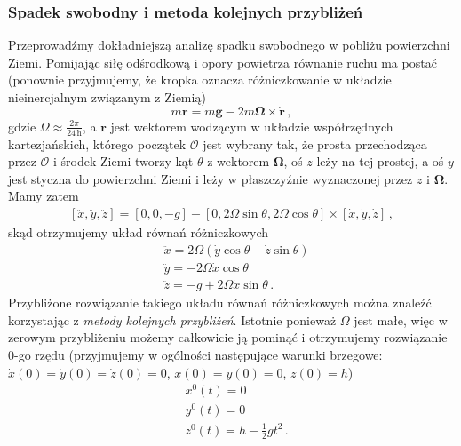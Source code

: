 \documentclass[../main.tex]{subfiles}
\begin{document}
\subsubsection*{Spadek swobodny i metoda kolejnych przybliżeń}
Przeprowadźmy dokładniejszą analizę spadku swobodnego w pobliżu powierzchni Ziemi. Pomijając siłę odśrodkową i opory powietrza równanie ruchu ma postać (ponownie przyjmujemy, że kropka oznacza różniczkowanie w układzie nieinercjalnym związanym z Ziemią)
\begin{equation*}
    m\ddot{\mathbf{r}}=m\mathbf{g}-2m\boldsymbol{\Omega}\times\dot{\mathbf{r}}\,,
\end{equation*}
gdzie \(\Omega\approx\frac{2\pi}{24\,\text{h}}\), a \(\mathbf{r}\) jest wektorem wodzącym w układzie współrzędnych kartezjańskich, którego początek \(\mathcal{O}\) jest wybrany tak, że prosta przechodząca przez \(\mathcal{O}\) i środek Ziemi tworzy kąt \(\theta\) z wektorem \(\boldsymbol{\Omega}\), oś \(z\) leży na tej prostej, a oś \(y\) jest styczna do powierzchni Ziemi i leży w płaszczyźnie wyznaczonej przez \(z\) i \(\boldsymbol{\Omega}\). Mamy zatem
\begin{equation*}
    \begin{split}
        [\ddot x,\ddot y, \ddot{z}]=[0,0,-g]-[0,2\Omega\sin\theta,2\Omega\cos\theta]\times[\dot x,\dot y, \dot z]\,,
    \end{split}
\end{equation*}
skąd otrzymujemy układ równań różniczkowych
\begin{equation*}
    \begin{split}
        &\ddot x=2\Omega(\dot y\cos\theta-\dot z\sin\theta)\\
        &\ddot y=-2\Omega \dot x\cos\theta\\
        &\ddot z=-g+2\Omega\dot x\sin\theta\,.
    \end{split}
\end{equation*}
Przybliżone rozwiązanie takiego układu równań różniczkowych można znaleźć korzystając z \textit{metody kolejnych przybliżeń}. Istotnie ponieważ \(\Omega\) jest małe, więc w zerowym przybliżeniu możemy całkowicie ją pominąć i otrzymujemy rozwiązanie 0-go rzędu (przyjmujemy w ogólności następujące warunki brzegowe: \(\dot x(0)=\dot y(0)=\dot z(0)=0\), \(x(0)=y(0)=0\), \(z(0)=h\))
\begin{equation*}
    \begin{split}
        &x^{0}(t)=0\\
        &y^{0}(t)=0\\
        &z^{0}(t)=h-\frac{1}{2}gt^2\,.
    \end{split}
\end{equation*}
\end{document}
